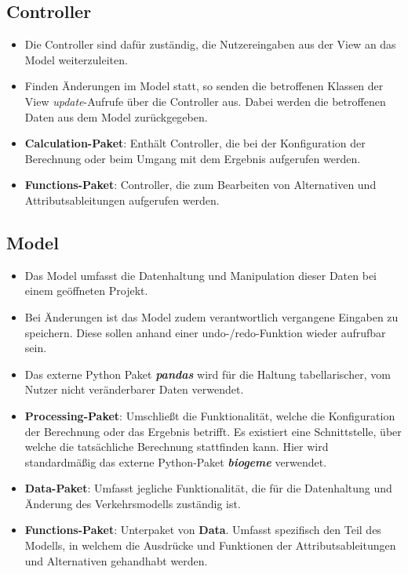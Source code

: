 \documentclass{article}
\begin{document}
\subsection{Controller}
\begin{itemize}
\item Die Controller sind dafür zuständig, die Nutzereingaben aus der View an das Model weiterzuleiten.
\item Finden Änderungen im Model statt, so senden die betroffenen Klassen der View \emph{update}-Aufrufe über die Controller aus. Dabei werden die betroffenen Daten aus dem Model zurückgegeben.
\item \textbf{Calculation-Paket}: Enthält Controller, die bei der Konfiguration der Berechnung oder beim Umgang mit dem Ergebnis aufgerufen werden.
\item \textbf{Functions-Paket}: Controller, die zum Bearbeiten von Alternativen und
Attributsableitungen aufgerufen werden.
\end{itemize}

\subsection{Model}
\begin{itemize}
\item Das Model umfasst die Datenhaltung und Manipulation dieser Daten bei einem geöffneten Projekt.
\item Bei Änderungen ist das Model zudem verantwortlich vergangene Eingaben zu speichern. Diese sollen anhand einer undo-/redo-Funktion wieder aufrufbar sein.
\item Das externe Python Paket \emph{\textbf{pandas}} wird für die Haltung tabellarischer, vom Nutzer nicht veränderbarer Daten verwendet.
\item \textbf{Processing-Paket}: Umschließt die Funktionalität, welche die Konfiguration der Berechnung oder das Ergebnis betrifft. Es existiert eine Schnittstelle, über welche die tatsächliche Berechnung stattfinden kann. Hier wird standardmäßig das externe Python-Paket \emph{\textbf{biogeme}} verwendet.
\item \textbf{Data-Paket}: Umfasst jegliche Funktionalität, die für die Datenhaltung und Änderung des Verkehrsmodells zuständig ist.
\item \textbf{Functions-Paket}: Unterpaket von \textbf{Data}. Umfasst spezifisch den Teil des Modells, in welchem die Ausdrücke und Funktionen der Attributsableitungen und Alternativen gehandhabt werden.
\end{itemize}
\end{document}
